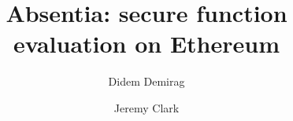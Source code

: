 \documentclass[envcountsect]{llncs}
\begin{document}
	
\frontmatter
\mainmatter

\title{\Large \bf Absentia: secure function evaluation on Ethereum}

\author{Didem Demirag \and Jeremy Clark}


\maketitle











\clearpage
\appendix
\end{document}
